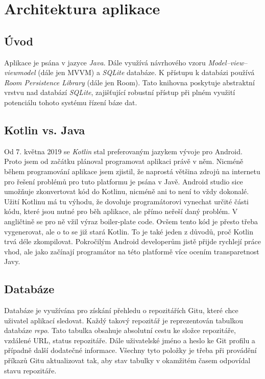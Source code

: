     \section{Architektura aplikace}

        \subsection{Úvod}
        Aplikace je psána v jazyce \emph{Java}. Dále využívá návrhového vzoru \emph{Model–view–viewmodel} (dále jen MVVM) a \emph{SQLite} databáze. K přístupu k databázi používá \emph{Room Persistence Library} (dále jen Room). Tato knihovna poskytuje abstraktní vrstvu nad databází \emph{SQLite}, zajišťující robustní přístup při plném využití potenciálu tohoto systému řízení báze dat.

        \subsection{Kotlin vs. Java}
        Od 7. května 2019 se \emph{Kotlin} stal preferovaným jazykem vývoje pro Android. Proto jsem od začátku plánoval programovat aplikaci právě v něm. Nicméně během programování aplikace jsem zjistil, že naprostá většina zdrojů na internetu pro řešení problémů pro tuto platformu je psána v Javě. Android studio sice umožňuje zkonvertovat kód do Kotlinu, nicméně ani to není to vždy dokonalé. Užití Kotlinu má tu výhodu, že dovoluje programátorovi vynechat určité části kódu, které jsou nutné pro běh aplikace, ale přímo neřeší daný problém. V angličtině se pro ně vžil výraz boiler-plate code. Ovšem tento kód je přesto třeba vygenerovat, ale o to se již stará Kotlin. To je také jeden z důvodů, proč Kotlin trvá déle zkompilovat. Pokročilým Android developerům jistě přijde rychlejí práce vhod, ale jako začínají programátor na této platformě více ocením transparetnost Javy.    

        \subsection{Databáze}
        Databáze je využívána pro získání přehledu o repozitářích Gitu, které chce uživatel aplikací sledovat. Každý takový repozitář je reprezentován tabulkou databáze \emph{repo}. Tato tabulka obsahuje absolutní cestu ke složce repozitáře, vzdálené URL, status repozitáře. Dále uživatelské jméno a heslo ke Git profilu a případně další dodatečné informace. Všechny tyto položky je třeba při provádění příkazů Gitu aktualizovat tak, aby stav tabulky v okamžitém časem odpovídal stavu repozitáře.

